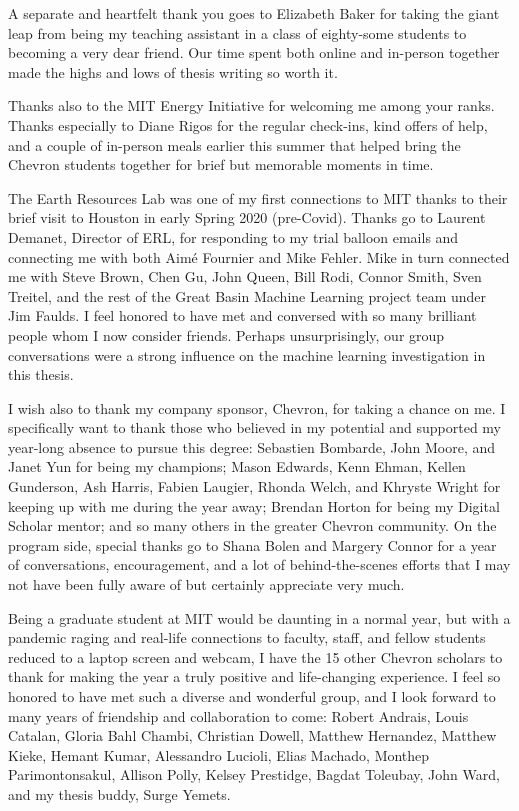A separate and heartfelt thank you goes to Elizabeth Baker for taking the giant leap from being my teaching assistant in a class of eighty-some students to becoming a very dear friend. Our time spent both online and in-person together made the highs and lows of thesis writing so worth it.

Thanks also to the MIT Energy Initiative for welcoming me among your ranks. Thanks especially to Diane Rigos for the regular check-ins, kind offers of help, and a couple of in-person meals earlier this summer that helped bring the Chevron students together for brief but memorable moments in time.

The Earth Resources Lab was one of my first connections to MIT thanks to their brief visit to Houston in early Spring 2020 (pre-Covid). Thanks go to Laurent Demanet, Director of ERL, for responding to my trial balloon emails and connecting me with both Aim\'e Fournier and Mike Fehler. Mike in turn connected me with Steve Brown, Chen Gu, John Queen, Bill Rodi, Connor Smith, Sven Treitel, and the rest of the Great Basin Machine Learning project team under Jim Faulds. I feel honored to have met and conversed with so many brilliant people whom I now consider friends. Perhaps unsurprisingly, our group conversations were a strong influence on the machine learning investigation in this thesis.

I wish also to thank my company sponsor, Chevron, for taking a chance on me. I specifically want to thank those who believed in my potential and supported my year-long absence to pursue this degree: Sebastien Bombarde, John Moore, and Janet Yun for being my champions; Mason Edwards, Kenn Ehman, Kellen Gunderson, Ash Harris, Fabien Laugier, Rhonda Welch, and Khryste Wright for keeping up with me during the year away; Brendan Horton for being my Digital Scholar mentor; and so many others in the greater Chevron community. On the program side, special thanks go to Shana Bolen and Margery Connor for a year of conversations, encouragement, and a lot of behind-the-scenes efforts that I may not have been fully aware of but certainly appreciate very much.

Being a graduate student at MIT would be daunting in a normal year, but with a pandemic raging and real-life connections to faculty, staff, and fellow students reduced to a laptop screen and webcam, I have the 15 other Chevron scholars to thank for making the year a truly positive and life-changing experience. I feel so honored to have met such a diverse and wonderful group, and I look forward to many years of friendship and collaboration to come: Robert Andrais, Louis Catalan, Gloria Bahl Chambi, Christian Dowell, Matthew Hernandez, Matthew Kieke, Hemant Kumar, Alessandro Lucioli, Elias Machado, Monthep Parimontonsakul, Allison Polly, Kelsey Prestidge, Bagdat Toleubay, John Ward, and my thesis buddy, Surge Yemets.

